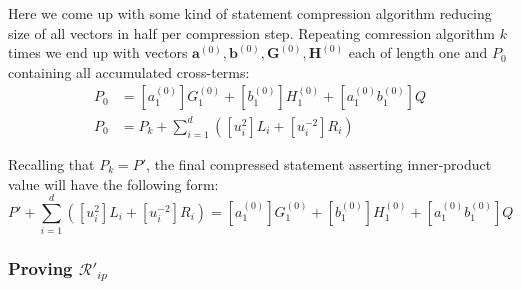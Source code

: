 \documentclass[../lecture-notes-148x210.tex]{subfiles}
\begin{document}
Here we come up with some kind of statement compression algorithm reducing size of all vectors in half per compression step. Repeating comression algorithm $k$ times we end up with vectors $\mathbf{a}^{(0)}, \mathbf{b}^{(0)}, \mathbf{G}^{(0)}, \mathbf{H}^{(0)}$ each of length one and $P_0$ containing all accumulated cross-terms:
\begin{align}
    P_0 &= [a_1^{(0)}]G_1^{(0)} + [b_1^{(0)}]H_1^{(0)} + [a_1^{(0)}b_1^{(0)}]Q \\
    P_0 &= P_k + \sum_{i=1}^d ([u_i^2]L_i + [u_i^{-2}]R_i)
\end{align}

Recalling that $P_k = P'$, the final compressed statement asserting inner-product value will have the following form:
$$P' + \sum_{i=1}^d ([u_i^2]L_i + [u_i^{-2}]R_i) = [a_1^{(0)}]G_1^{(0)} + [b_1^{(0)}]H_1^{(0)} + [a_1^{(0)}b_1^{(0)}]Q$$

\subsubsection{Proving $\mathcal{R}'_{ip}$}
\end{document}

